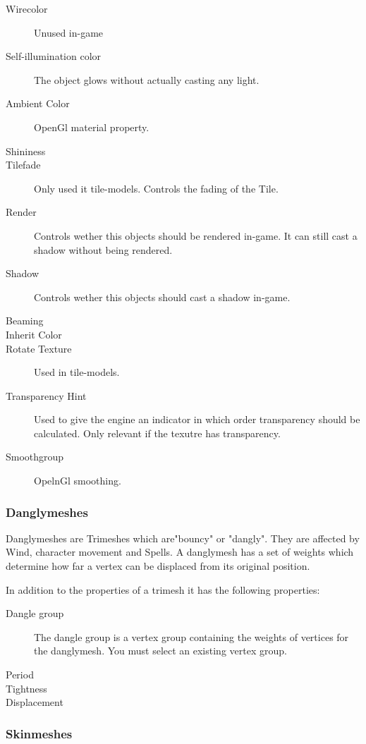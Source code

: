\begin{description}
    \item[Wirecolor] Unused in-game
    \item[Self-illumination color] The object glows without actually casting any light.
    \item[Ambient Color] OpenGl material property.
    \item[Shininess]
    \item[Tilefade] Only used it tile-models. Controls the fading of the Tile.
    \item[Render] Controls wether this objects should be rendered in-game. It can still cast a shadow without being rendered.
    \item[Shadow] Controls wether this objects should cast a shadow in-game.
    \item[Beaming]
    \item[Inherit Color]
    \item[Rotate Texture] Used in tile-models.
    \item[Transparency Hint] Used to give the engine an indicator in which order transparency should be calculated. Only relevant if the texutre has transparency.
    \item[Smoothgroup] OpelnGl smoothing.
\end{description}

\subsubsection{Danglymeshes}
Danglymeshes are Trimeshes which are"bouncy" or "dangly". They are affected by
Wind, character movement and Spells. A danglymesh has a set of weights which
determine how far a vertex can be displaced from its original position.

In addition to the properties of a trimesh it has the following properties:
\begin{description}
    \item[Dangle group] The dangle group is a vertex group containing the weights of vertices for the danglymesh. You must select an existing vertex group.
    \item[Period]
    \item[Tightness]
    \item[Displacement]
\end{description}

\subsubsection{Skinmeshes}

